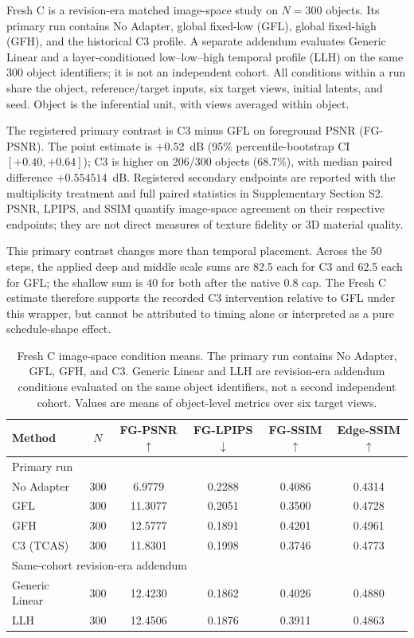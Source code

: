 \documentclass[times,twocolumn,final]{elsarticle}
\begin{document}
Fresh C is a revision-era matched image-space study on $N=300$ objects. Its primary run contains No Adapter, global fixed-low (GFL), global fixed-high (GFH), and the historical C3 profile. A separate addendum evaluates Generic Linear and a layer-conditioned low--low--high temporal profile (LLH) on the same 300 object identifiers; it is not an independent cohort. All conditions within a run share the object, reference/target inputs, six target views, initial latents, and seed. Object is the inferential unit, with views averaged within object.

The registered primary contrast is C3 minus GFL on foreground PSNR (FG-PSNR). The point estimate is $+0.52$~dB (95\% percentile-bootstrap CI $[+0.40,+0.64]$); C3 is higher on 206/300 objects (68.7\%), with median paired difference $+0.554514$~dB. Registered secondary endpoints are reported with the multiplicity treatment and full paired statistics in Supplementary Section S2. PSNR, LPIPS, and SSIM quantify image-space agreement on their respective endpoints; they are not direct measures of texture fidelity or 3D material quality.

This primary contrast changes more than temporal placement. Across the 50 steps, the applied deep and middle scale sums are 82.5 each for C3 and 62.5 each for GFL; the shallow sum is 40 for both after the native 0.8 cap. The Fresh C estimate therefore supports the recorded C3 intervention relative to GFL under this wrapper, but cannot be attributed to timing alone or interpreted as a pure schedule-shape effect.

\begin{table}[t]
\centering
\caption{Fresh C image-space condition means. The primary run contains No Adapter, GFL, GFH, and C3. Generic Linear and LLH are revision-era addendum conditions evaluated on the same object identifiers, not a second independent cohort. Values are means of object-level metrics over six target views.}
\label{tab:freshc-absolute}
\scriptsize\setlength{\tabcolsep}{4pt}
\begin{tabular}{lccccc}
\toprule
Method & $N$ & FG-PSNR$\uparrow$ & FG-LPIPS$\downarrow$ & FG-SSIM$\uparrow$ & Edge-SSIM$\uparrow$ \\
\midrule
\multicolumn{6}{l}{Primary run} \\
No Adapter & 300 & 6.9779 & 0.2288 & 0.4086 & 0.4314 \\
GFL & 300 & 11.3077 & 0.2051 & 0.3500 & 0.4728 \\
GFH & 300 & 12.5777 & 0.1891 & 0.4201 & 0.4961 \\
C3 (TCAS) & 300 & 11.8301 & 0.1998 & 0.3746 & 0.4773 \\
\midrule
\multicolumn{6}{l}{Same-cohort revision-era addendum} \\
Generic Linear & 300 & 12.4230 & 0.1862 & 0.4026 & 0.4880 \\
LLH & 300 & 12.4506 & 0.1876 & 0.3911 & 0.4863 \\
\bottomrule
\end{tabular}
\end{table}
\end{document}

